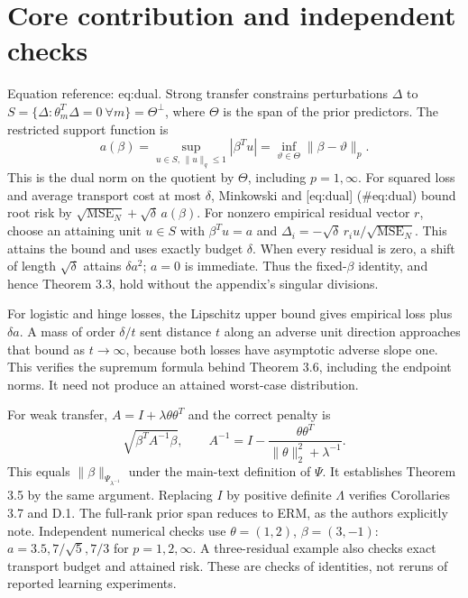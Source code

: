 \documentclass[10pt]{article}
\begin{document}
\section*{Core contribution and independent checks}
Equation reference: eq:dual. Strong transfer constrains perturbations \(\Delta\) to \(S=\{\Delta:\theta_m^T\Delta=0\ \forall m\}=\Theta^\perp\), where \(\Theta\) is the span of the prior predictors. The restricted support function is \[
 a(\beta)=\sup_{u\in S,\,\|u\|_q\leq1}|\beta^Tu|
 =\inf_{\vartheta\in\Theta}\|\beta-\vartheta\|_p.\] This is the dual norm on the quotient by \(\Theta\), including \(p=1,\infty\). For squared loss and average transport cost at most \(\delta\), Minkowski and [eq:dual] (\#eq:dual) bound root risk by \(\sqrt{\mathrm{MSE}_N}+\sqrt\delta\,a(\beta)\). For nonzero empirical residual vector \(r\), choose an attaining unit \(u\in S\) with \(\beta^Tu=a\) and \(\Delta_i=-\sqrt\delta\,r_i u/\sqrt{\mathrm{MSE}_N}\). This attains the bound and uses exactly budget \(\delta\). When every residual is zero, a shift of length \(\sqrt\delta\) attains \(\delta a^2\); \(a=0\) is immediate. Thus the fixed-\(\beta\) identity, and hence Theorem 3.3, hold without the appendix’s singular divisions.\par
For logistic and hinge losses, the Lipschitz upper bound gives empirical loss plus \(\delta a\). A mass of order \(\delta/t\) sent distance \(t\) along an adverse unit direction approaches that bound as \(t\to\infty\), because both losses have asymptotic adverse slope one. This verifies the supremum formula behind Theorem 3.6, including the endpoint norms. It need not produce an attained worst-case distribution.\par
For weak transfer, \(A=I+\lambda\theta\theta^T\) and the correct penalty is \[\sqrt{\beta^TA^{-1}\beta},\qquad
 A^{-1}=I-\frac{\theta\theta^T}{\|\theta\|_2^2+\lambda^{-1}}.\] This equals \(\|\beta\|_{\Psi_{\lambda^{-1}}}\) under the main-text definition of \(\Psi\). It establishes Theorem 3.5 by the same argument. Replacing \(I\) by positive definite \(\Lambda\) verifies Corollaries 3.7 and D.1. The full-rank prior span reduces to ERM, as the authors explicitly note. Independent numerical checks use \(\theta=(1,2)\), \(\beta=(3,-1)\): \(a=3.5,7/\sqrt5,7/3\) for \(p=1,2,\infty\). A three-residual example also checks exact transport budget and attained risk. These are checks of identities, not reruns of reported learning experiments.\par
\end{document}
